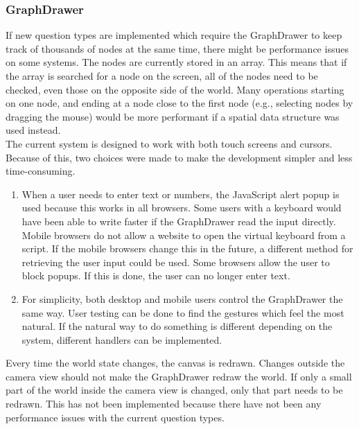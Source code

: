 \subsubsection{GraphDrawer}
If new question types are implemented which require the GraphDrawer to keep track of thousands of nodes at the same time, there might be performance issues on some systems. The nodes are currently stored in an array. This means that if the array is searched for a node on the screen, all of the nodes need to be checked, even those on the opposite side of the world. Many operations starting on one node, and ending at a node close to the first node (e.g., selecting nodes by dragging the mouse) would be more performant if a spatial data structure\cite{SpatialDatastructure} was used instead.
\\[11pt]
The current system is designed to work with both touch screens and cursors. Because of this, two choices were made to make the development simpler and less time-consuming.
\begin{enumerate}
    \item When a user needs to enter text or numbers, the JavaScript alert popup is used because this works in all browsers. Some users with a keyboard would have been able to write faster if the GraphDrawer read the input directly. Mobile browsers do not allow a website to open the virtual keyboard from a script. If the mobile browsers change this in the future, a different method for retrieving the user input could be used. Some browsers allow the user to block popups. If this is done, the user can no longer enter text.
    \item For simplicity, both desktop and mobile users control the GraphDrawer the same way. User testing can be done to find the gestures which feel the most natural. If the natural way to do something is different depending on the system, different handlers can be implemented.
\end{enumerate}
Every time the world state changes, the canvas is redrawn. Changes outside the camera view should not make the GraphDrawer redraw the world. If only a small part of the world inside the camera view is changed, only that part needs to be redrawn. This has not been implemented because there have not been any performance issues with the current question types.